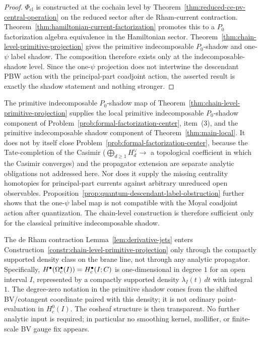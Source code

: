 \begin{proof}
  $\Phi_{\mathrm{cl}}$ is constructed at the cochain level by
  Theorem~\ref{thm:reduced-ce-pv-central-operation} on the reduced sector
  after de Rham-current contraction.  Theorem~\ref{thm:hamiltonian-current-factorization}
  promotes this to a $P_0$ factorization algebra equivalence
  in the Hamiltonian sector.
	  Theorem~\ref{thm:chain-level-primitive-projection} gives the
	  primitive indecomposable \(P_0\)-shadow and one-$\psi$ label shadow. The
  composition therefore exists only at the indecomposable-shadow level.
  Since the one-$\psi$ projection does not intertwine the descendant
  PBW action with the principal-part coadjoint action, the
  asserted result is exactly the shadow statement and nothing stronger.
\end{proof}

\begin{rmk}
  \label{rmk:T5-primitive-shadow-status}
	  The primitive indecomposable \(P_0\)-shadow map of
	  Theorem~\ref{thm:chain-level-primitive-projection} supplies the
	  local primitive indecomposable \(P_0\)-shadow component of
  Problem~\ref{prob:formal-factorization-center}, item~(3), and the
	  primitive indecomposable shadow component of
  Theorem~\ref{thm:main-local}. It does not by itself close
  Problem~\ref{prob:formal-factorization-center},
  because the Tate-completion of the Casimir
  ($\bigoplus_{d\geq 1}H_d^\vee\to$ a topological coefficient in
  which the Casimir converges) and the propagator extension are
  separate analytic obligations not addressed here. Nor does it supply
  the missing centrality homotopies for principal-part currents against
  arbitrary unreduced open observables.
  Proposition~\ref{prop:quantum-descendant-label-obstruction} further
  shows that the one-\(\psi\) label map is not compatible with the
  Moyal coadjoint action after quantization. The chain-level
  construction is therefore sufficient only for the classical primitive
  indecomposable shadow.
\end{rmk}

\begin{rmk}
  \label{rmk:role-of-deRham-contraction}
  The de Rham contraction Lemma~\ref{lem:derivative-jets} enters
  Construction~\ref{constr:chain-level-primitive-projection} only
  through the compactly supported density class on the brane line, not
  through any analytic propagator.  Specifically,
  \(H^\bullet(\Omega^\bullet_c(I))=H^\bullet_c(I;C)\) is one-dimensional
  in degree \(1\) for an open interval \(I\), represented by a compactly
  supported density \(\lambda_I(t)\,dt\) with integral \(1\). The
	  degree-zero notation in the primitive shadow comes from the shifted
  BV/cotangent coordinate paired with this density; it is not ordinary
  point-evaluation in \(H_c^0(I)\).  The cosheaf structure is then
  transparent.
  No further analytic input is required; in particular no
  smoothing kernel, mollifier, or finite-scale BV gauge fix appears.
\end{rmk}
